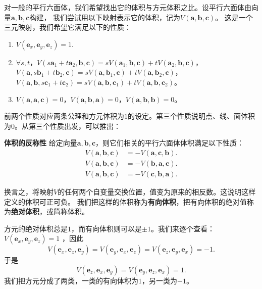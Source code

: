 \documentclass[12pt,UTF8,fontset=none]{ctexbook}
\begin{document}
对一般的平行六面体，我们希望找出它的体积与方元体积之比。设平行六面体由向量$\mathbf{a},\mathbf{b},\mathbf{c}$构建，
我们尝试用以下映射表示它的体积，记为$V(\mathbf{a},\mathbf{b},\mathbf{c})$。
这是一个三元映射，我们希望它满足以下的性质：
\begin{enumerate}
    \item $V(\mathbf{e}_x, \mathbf{e}_y, \mathbf{e}_z) = 1.$ 
    \item $\forall s,t$，$V(s\mathbf{a}_1+t\mathbf{a}_2,\mathbf{b},\mathbf{c}) = sV(\mathbf{a}_1,\mathbf{b},\mathbf{c})+tV(\mathbf{a}_2,\mathbf{b},\mathbf{c})$，$V(\mathbf{a},s\mathbf{b}_1+t\mathbf{b}_2,\mathbf{c}) = sV(\mathbf{a},\mathbf{b}_1,\mathbf{c})+tV(\mathbf{a},\mathbf{b}_2,\mathbf{c})$，$V(\mathbf{a},\mathbf{b},s\mathbf{c}_1+t\mathbf{c}_2) = sV(\mathbf{a},\mathbf{b},\mathbf{c}_1)+tV(\mathbf{a},\mathbf{b},\mathbf{c}_2)$。
    \item $V(\mathbf{a},\mathbf{a},\mathbf{c}) = 0$，$V(\mathbf{a},\mathbf{b},\mathbf{a})=0$，$V(\mathbf{a},\mathbf{b},\mathbf{b})=0$。
\end{enumerate}
前两个性质对应两条公理和方元体积为$1$的设定。第三个性质说明点、线、面体积为$0$。从第三个性质出发，可以推出：
\begin{tm}{\textbf{体积的反称性}}\label{tm:3-0-0}
    给定向量$\mathbf{a},\mathbf{b},\mathbf{c}$，则它们相关的平行六面体体积满足以下性质：
    \begin{align*}
        V(\mathbf{a},\mathbf{b},\mathbf{c}) &= -V(\mathbf{a},\mathbf{c},\mathbf{b}).  \\
        V(\mathbf{a},\mathbf{b},\mathbf{c}) &= -V(\mathbf{b},\mathbf{a},\mathbf{c}).  \\
        V(\mathbf{a},\mathbf{b},\mathbf{c}) &= -V(\mathbf{c},\mathbf{b},\mathbf{a}).  
    \end{align*}
\end{tm}
换言之，将映射$V$的任何两个自变量交换位置，值变为原来的相反数。这说明这样定义的体积可正可负。
我们把这样的体积称为\textbf{有向体积}，把有向体积的绝对值称为\textbf{绝对体积}，或简称体积。

方元的绝对体积总是$1$，而有向体积则可以是$\pm 1$。我们来逐个查看：
$V(\mathbf{e}_x, \mathbf{e}_y, \mathbf{e}_z) = 1$ ，因此
$$ V(\mathbf{e}_x, \mathbf{e}_z, \mathbf{e}_y) = V(\mathbf{e}_y, \mathbf{e}_x, \mathbf{e}_z)  = V(\mathbf{e}_z, \mathbf{e}_y, \mathbf{e}_x)  = -1.$$
于是
$$ V(\mathbf{e}_z, \mathbf{e}_x, \mathbf{e}_y) = V(\mathbf{e}_y, \mathbf{e}_z, \mathbf{e}_x)   = 1.$$
我们把方元分成了两类，一类的有向体积为$1$，另一类为$-1$。
\end{document}
